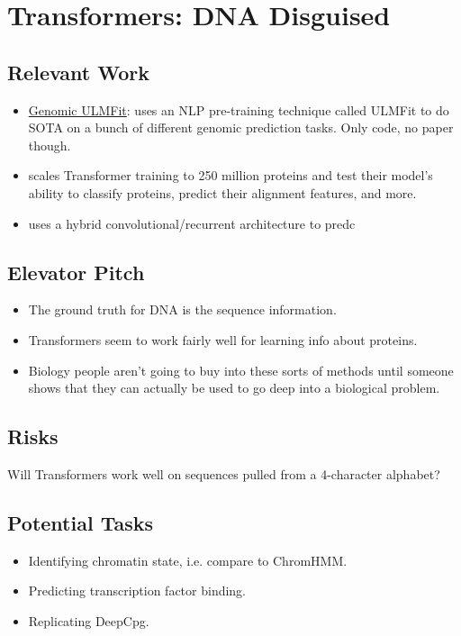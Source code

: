 \section{Transformers: DNA Disguised}
\subsection{Relevant Work}
\begin{itemize}

    \item \hyperlink{https://github.com/kheyer/Genomic-ULMFiT}{Genomic ULMFit}: uses an NLP pre-training technique called ULMFit to do SOTA on a bunch of different genomic prediction tasks. Only code, no paper though.
    \item \cite{Rives2019-re} scales Transformer training to 250 million proteins and test their model's ability to classify proteins, predict their alignment features, and more.
    \item \cite{Quang2016-ar} uses a hybrid convolutional/recurrent architecture to predc
\end{itemize}

\subsection{Elevator Pitch}
\begin{itemize}
    \item The ground truth for DNA is the sequence information. 
    \item Transformers seem to work fairly well for learning info about proteins.
    \item Biology people aren't going to buy into these sorts of methods until someone shows that they can actually be used to go deep into a biological problem.
\end{itemize}

\subsection{Risks}
Will Transformers work well on sequences pulled from a 4-character alphabet?

\subsection{Potential Tasks}
\begin{itemize}
    \item Identifying chromatin state, i.e. compare to ChromHMM.
    \item Predicting transcription factor binding.
    \item Replicating DeepCpg.
\end{itemize}

